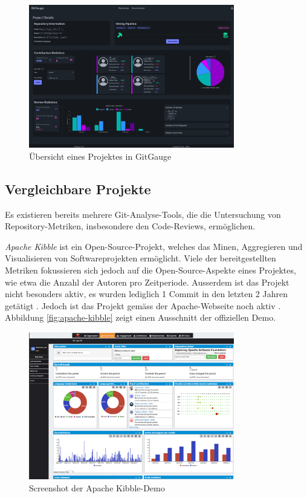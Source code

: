 \begin{figure}[htbp]
    \centering
    \includegraphics[width=0.8\textwidth]{Figures/giggauge-overview.png}
    \caption{Übersicht eines Projektes in GitGauge}
    \label{fig:gitgauge-project-overview}
\end{figure}

\newpage


\subsection{Vergleichbare Projekte}
Es existieren bereits mehrere Git-Analyse-Tools, die die Untersuchung von Repository-Metriken, insbesondere den Code-Reviews, ermöglichen. 

\textit{Apache Kibble} ist ein Open-Source-Projekt, welches das Minen, Aggregieren und Visualisieren von Softwareprojekten ermöglicht. Viele der bereitgestellten Metriken fokussieren sich jedoch auf die Open-Source-Aspekte eines Projektes, wie etwa die Anzahl der Autoren pro Zeitperiode. Ausserdem ist das Projekt nicht besonders aktiv, es wurden lediglich 1 Commit in den letzten 2 Jahren getätigt \parencite{noauthor_apachekibble-1_2025}. Jedoch ist das Projekt gemäss der Apache-Webseite noch aktiv \parencite{noauthor_apache_nodate}. Abbildung \autoref{fig:apache-kibble} zeigt einen Ausschnitt der offiziellen Demo. 
\begin{figure}[htbp]
    \centering
    \includegraphics[width=0.8\textwidth]{Figures/apache-kibble.png}
    \caption{Screenshot der Apache Kibble-Demo \parencite{noauthor_code_nodate}}
    \label{fig:apache-kibble}
\end{figure}

